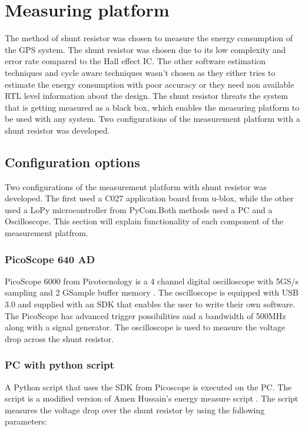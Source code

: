 \chapter{Measuring platform}

The method of shunt resistor was chosen to measure the energy consumption of the GPS system. The shunt resistor was chosen due to its low complexity and error rate compared to the Hall effect IC. The other software estimation techniques and cycle aware techniques wasn't chosen as they either tries to estimate the energy consumption with poor accuracy or they need non available RTL level information about the design. The shunt resistor threats the system that is getting measured as a black box, which enables the measuring platform to be used with any system. Two configurations of the measurement platform with a shunt resistor was developed. 

\section{Configuration options}
 Two configurations of the measurement platform with shunt resistor was developed. The first used a C027 application board from u-blox, while the other used a LoPy microcontroller from PyCom.Both methods used a PC and a Oscilloscope. This section will explain functionality of each component of the measurement platfrom.
 
 \subsection{PicoScope 640 AD}
PicoScope 6000 from Picotecnology is a 4 channel digital oscilloscope with 5GS/s sampling and 2 GSample buffer memory \cite{Pico}. The oscilloscope is equipped with USB 3.0 and supplied with an SDK that enables the user to write their own software. The PicoScope has advanced trigger possibilities and a bandwidth of 500MHz along with a signal generator. The oscilloscope is used to measure the voltage drop across the shunt resistor.  

\subsection{PC with python script}
A Python script that uses the SDK from Picoscope is executed on the PC. The script is a modified version of Amen Hussain's energy measure script \cite{Amen}. The script measures the voltage drop over the shunt resistor by using the following parameters:

